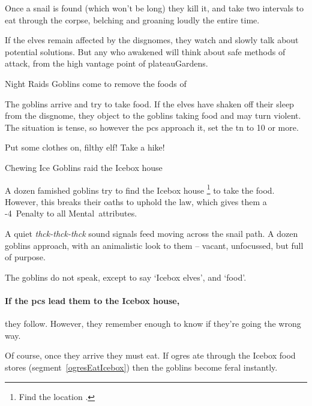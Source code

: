 \begin{multicols}{2}
Once a snail is found (which won't be long) they kill it, and take two \glspl{interval} to eat through the corpse, belching and groaning loudly the entire time.

If the elves remain affected by the \glspl{disgnome}, they watch and slowly talk about potential solutions.
But any who awakened will think about safe methods of attack, from the high vantage point of \gls{plateauGardens}.

{Night Raids}%
{Goblins come to remove the foods of }%

The goblins arrive and try to take food.
If the elves have shaken off their sleep from the \gls{disgnome}, they object to the goblins taking food and may turn violent.
The situation is tense, so however the \glspl{pc} approach it, set the \gls{tn} to 10 or more.


\begin{boxtext}
  Put some clothes on, filthy elf!
  Take a hike!
\end{boxtext}

{Chewing Ice}%
{Goblins raid the Icebox house}%

A dozen famished goblins try to find the Icebox house%
\footnote{Find the location .}
to take the food.
However, this breaks their oaths to uphold the law, which gives them a -4~Penalty to all Mental~\glspl{attribute}.

\begin{boxtext}
  A quiet \textit{thck-thck-thck} sound signals feed moving across the snail path.
  A dozen goblins approach, with an animalistic look to them -- vacant, unfocussed, but full of purpose.
\end{boxtext}

The goblins do not speak, except to say `Icebox elves', and `food'.

\paragraph{If the \glspl{pc} lead them to the Icebox house,}
they follow.
However, they remember enough to know if they're going the wrong way.

Of course, once they arrive they must eat.
If \glspl{ogre} ate through the Icebox food stores (\gls{segment}~\vref{ogresEatIcebox}) then the goblins become feral instantly.


\end{multicols}
